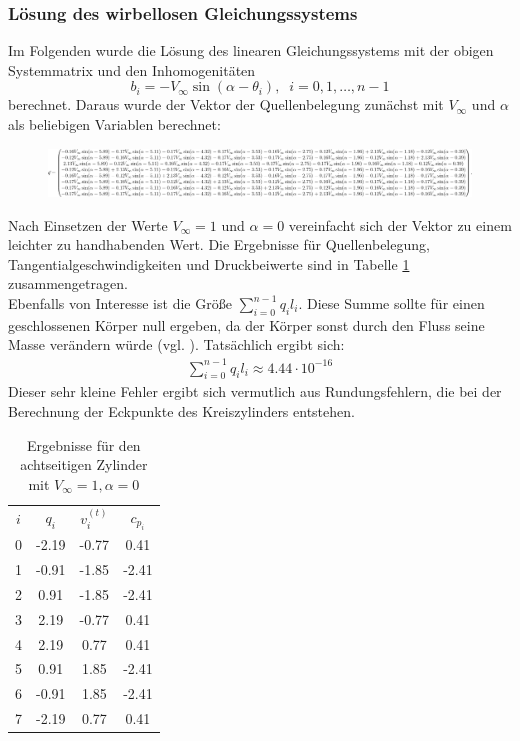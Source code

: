 \subsubsection{Lösung des wirbellosen Gleichungssystems}
Im Folgenden wurde die Lösung des linearen Gleichungssystems mit der obigen Systemmatrix und den Inhomogenitäten
\begin{equation}
b_i =  -V_{\infty} \sin{(\alpha -\theta _i)}, \;\; i= 0,1,\ldots, n-1
\end{equation}
berechnet. Daraus wurde der Vektor der Quellenbelegung zunächst mit $V_{\infty}$ und $\alpha $ als beliebigen Variablen berechnet: \\
\begin{figure}[!h]
\begin{center}
\includegraphics[scale=0.2]{figures/analytical.png} 
\label{fig:analyticalcylinder8}
\end{center}
\end{figure}

Nach Einsetzen der Werte $V_{\infty} = 1$ und $\alpha  = 0$ vereinfacht sich der Vektor zu einem leichter zu handhabenden Wert. Die Ergebnisse für Quellenbelegung, Tangentialgeschwindigkeiten und Druckbeiwerte sind in Tabelle \ref{tab:cyl8} zusammengetragen. \\
Ebenfalls von Interesse ist die Größe $\sum_{i=0}^{n-1} q_i l_i$. Diese Summe sollte für einen geschlossenen Körper null ergeben, da der Körper sonst durch den Fluss seine Masse verändern würde (vgl. \cite{Barba:2019}). Tatsächlich ergibt sich:
\begin{align*}
\sum_{i=0}^{n-1} q_i l_i \approx 4.44 \cdot 10^{-16}
\end{align*}
Dieser sehr kleine Fehler ergibt sich vermutlich aus Rundungsfehlern, die bei der Berechnung der Eckpunkte des Kreiszylinders entstehen.

\begin{table}
\caption{Ergebnisse für den achtseitigen Zylinder mit $V_{\infty} = 1, \alpha  = 0$}
\label{tab:cyl8}
\begin{center}
\begin{tabular}{c|ccc}
$i$ & $q_i$ & $v_i^{(t)}$ & $c_{p_i}$ \\
0 & -2.19 & -0.77 & 0.41 \\
1 & -0.91 & -1.85 & -2.41 \\
2 & 0.91 & -1.85 & -2.41 \\
3 & 2.19 & -0.77 & 0.41 \\
4 & 2.19 & 0.77 &  0.41 \\ 
5 &  0.91 & 1.85 & -2.41 \\
6 & -0.91 & 1.85 & -2.41 \\
7 & -2.19 &0.77 & 0.41
\end{tabular}
\end{center}
\end{table}

